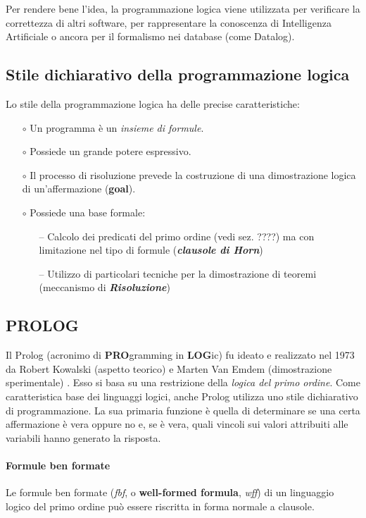 \documentclass[11pt]{article}
\begin{document}
Per rendere bene l'idea, la programmazione logica viene utilizzata per verificare la correttezza di altri software, per rappresentare la conoscenza di Intelligenza Artificiale o ancora per il formalismo nei database (come Datalog).

\subsection{Stile dichiarativo della programmazione logica}
Lo stile della programmazione logica ha delle precise caratteristiche:
\begin{itemize}
 	\item[$\circ$] Un programma è un \textit{insieme di formule}.
 	\item[$\circ$] Possiede un grande potere espressivo.
 	\item[$\circ$] Il processo di risoluzione prevede la costruzione di una dimostrazione logica di un'affermazione (\textbf{goal}).
 	\item[$\circ$] Possiede una \color{red}base formale\color{black}:
 	\begin{itemize}
 		\item[--] Calcolo dei predicati del primo ordine (vedi sez. ????) ma con limitazione nel tipo di formule (\textbf{\emph{clausole di Horn}})
 		\item[--] Utilizzo di particolari tecniche per la dimostrazione di teoremi (meccanismo di \textbf{\emph{Risoluzione}})
 	\end{itemize}
\end{itemize}

\subsection{PROLOG}
Il Prolog (acronimo di \textbf{PRO}gramming in \textbf{LOG}ic) fu ideato e realizzato nel 1973 da Robert Kowalski (aspetto teorico) e Marten Van Emdem (dimostrazione sperimentale) . Esso si basa su una restrizione della \textit{logica del primo ordine}. Come caratteristica base dei linguaggi logici, anche Prolog utilizza uno stile dichiarativo di programmazione. La sua primaria funzione è quella di determinare se una certa affermazione è vera oppure no e, se è vera, quali vincoli sui valori attribuiti alle variabili hanno generato la risposta.
\paragraph{Formule ben formate} Le formule ben formate (\textit{fbf}, o \textbf{well-formed formula}, \textit{wff}) di un linguaggio logico del primo ordine può essere riscritta in \color{red}forma normale a clausole\color{black}.
\end{document}
